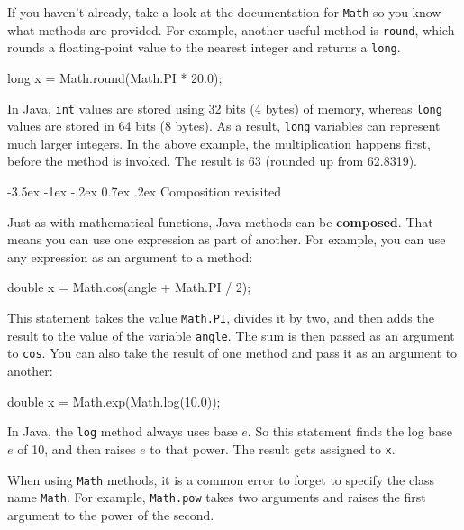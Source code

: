 \documentclass[12pt]{book}
\makeatletter
\theoremstyle{exercise}
\newcommand{\java}[1]{\verb"#1"}
\renewcommand{\section}{\@startsection{section}{1}{\z@}%
    {-3.5ex \@plus -1ex \@minus -.2ex}%
    {0.7ex \@plus.2ex}%
    {\normalfont\Large\bfseries}}
\newcommand{\java}[1]{\lstinline{#1}} %
\makeatother
\begin{document}

If you haven't already, take a look at the documentation for \java{Math} so you know what methods are provided.
For example, another useful method is \java{round}, which rounds a floating-point value to the nearest integer and returns a \java{long}.

\begin{code}
    long x = Math.round(Math.PI * 20.0);
\end{code}

In Java, \java{int} values are stored using 32 bits (4 bytes) of memory, whereas \java{long} values are stored in 64 bits (8 bytes).
As a result, \java{long} variables can represent much larger integers.
In the above example, the multiplication happens first, before the method is invoked.
The result is 63 (rounded up from 62.8319).

\section{Composition revisited}


Just as with mathematical functions, Java methods can be {\bf composed}.
That means you can use one expression as part of another.
For example, you can use any expression as an argument to a method:

\begin{code}
    double x = Math.cos(angle + Math.PI / 2);
\end{code}

This statement takes the value \java{Math.PI}, divides it by two, and then adds the result to the value of the variable \java{angle}.
The sum is then passed as an argument to \java{cos}.
You can also take the result of one method and pass it as an argument to another:

\begin{code}
    double x = Math.exp(Math.log(10.0));
\end{code}

In Java, the \java{log} method always uses base $e$.
So this statement finds the log base $e$ of 10, and then raises $e$ to that power.
The result gets assigned to \java{x}.

When using \java{Math} methods, it is a common error to forget to specify the class name \java{Math}.
For example, \java{Math.pow} takes two arguments and raises the first argument to the power of the second.
\end{document}
